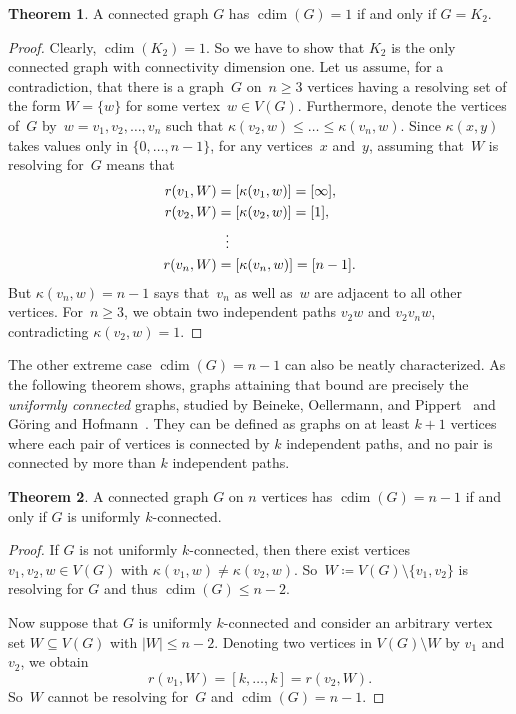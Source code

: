\documentclass[letterpaper,12pt,headings=normal,parskip=half]{scrartcl}
\DeclareMathOperator{\cdim}{cdim}
\theoremstyle{definition}
\newtheorem{theorem}{Theorem}
\begin{document}
\begin{theorem}\label{thm:cdim_1}
A connected graph $G$ has ${{\cdim(G)=1}}$ if and only if ${{G=K_2}}$.
\begin{proof}
Clearly, ${{\cdim(K_2)=1}}$. 
So we have to show that $K_2$ is the only connected graph with connectivity dimension one. 
Let us assume, for a contradiction, that there is a graph~$G$ on~$n\geq 3$ vertices having a resolving set of the form $W=\{w\}$ for some vertex~$w\in V(G)$. 
Furthermore, denote the vertices of~$G$ by~$w=v_1,v_2,\ldots,v_n$ such that $\kappa(v_2,w)\leq \ldots \leq \kappa(v_n,w)$. 
Since $\kappa(x,y)$ takes values only in $\{0,\ldots,n-1\}$, for any vertices~$x$ and~$y$, assuming that~$W$ is resolving for~$G$ means that
\begin{align*}
    r(v_1,W) &= [\kappa(v_1,w)] = [\infty],\\
    r(v_2,W) &= [\kappa(v_2,w)] = [1],\\
    &\hspace{2.2mm}\vdots\\
    r(v_n,W) &= [\kappa(v_n,w)] = [n-1].
\end{align*}
But $\kappa(v_n,w)=n-1$ says that~$v_n$ as well as~$w$ are adjacent to all other vertices. For~$n\geq 3$, we obtain two independent paths $v_2w$ and $v_2v_nw$, contradicting $\kappa(v_2,w) = 1$.
\end{proof}
\end{theorem}

The other extreme case $\cdim(G)=n-1$ can also be neatly characterized. 
As the following theorem shows, graphs attaining that bound are precisely the \emph{uniformly connected} graphs, studied by Beineke, Oellermann, and Pippert~\cite{beineke2002average} and Göring and Hofmann~\cite{hofmann2022uniformly}. 
They can be defined as graphs on at least $k+1$ vertices where each pair of vertices is connected by $k$ independent paths, and no pair is connected by more than $k$ independent paths. 

\begin{theorem}\label{thm:cdim_n-1}
A connected graph $G$ on $n$ vertices has ${{\cdim(G)=n-1}}$ if and only if $G$ is uniformly $k$-connected.
\begin{proof}
If $G$ is not uniformly $k$-connected, then there exist vertices ${{v_1,v_2,w\in V(G)}}$ with ${{\kappa(v_1,w)\neq \kappa(v_2,w)}}$. So~${{W\coloneqq V(G)\setminus\{v_1,v_2\}}}$ is resolving for $G$ and thus ${{\cdim(G)\leq n-2}}$.

Now suppose that $G$ is uniformly $k$-connected and consider an arbitrary vertex set ${{W\subseteq V(G)}}$ with ${{|W|\leq n-2}}$.
Denoting two vertices in ${{V(G)\setminus W}}$ by $v_1$ and $v_2$, we obtain
\begin{equation*}
    r(v_1,W)= [k,\ldots,k] = r(v_2,W).
\end{equation*}
So~$W$ cannot be resolving for~$G$ and ${{\cdim(G) = n-1}}$.
\end{proof}
\end{theorem}
\end{document}
